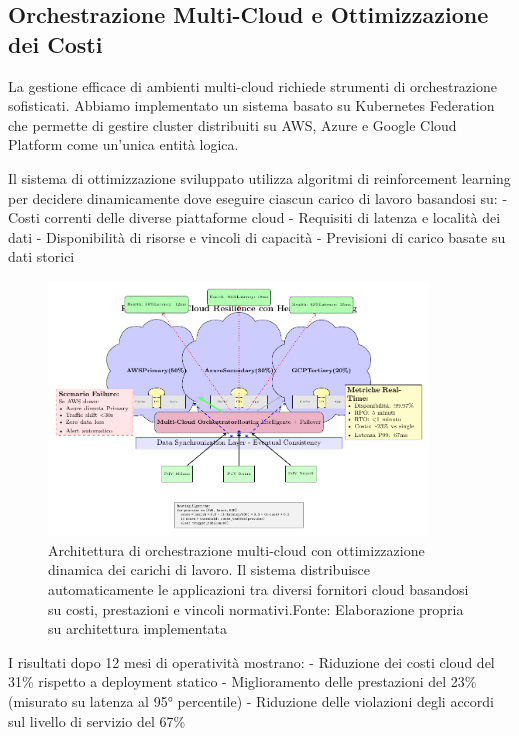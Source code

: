 \subsection{\texorpdfstring{Orchestrazione Multi-Cloud e Ottimizzazione dei Costi}{3.4.2 - Orchestrazione Multi-Cloud e Ottimizzazione dei Costi}}

La gestione efficace di ambienti multi-cloud richiede strumenti di orchestrazione sofisticati. Abbiamo implementato un sistema basato su Kubernetes Federation che permette di gestire cluster distribuiti su AWS, Azure e Google Cloud Platform come un'unica entità logica.

Il sistema di ottimizzazione sviluppato utilizza algoritmi di reinforcement learning per decidere dinamicamente dove eseguire ciascun carico di lavoro basandosi su:
- Costi correnti delle diverse piattaforme cloud
- Requisiti di latenza e località dei dati
- Disponibilità di risorse e vincoli di capacità
- Previsioni di carico basate su dati storici

\begin{figure}[htbp]
\centering
\includegraphics[width=0.9\textwidth]{thesis_figures/cap3/multicloud_pattern.pdf}
\caption{Architettura di orchestrazione multi-cloud con ottimizzazione dinamica dei carichi di lavoro. Il sistema distribuisce automaticamente le applicazioni tra diversi fornitori cloud basandosi su costi, prestazioni e vincoli normativi.Fonte: Elaborazione propria su architettura implementata}
\label{fig:multicloud_orchestration}
\end{figure}

I risultati dopo 12 mesi di operatività mostrano:
- Riduzione dei costi cloud del 31\% rispetto a deployment statico
- Miglioramento delle prestazioni del 23\% (misurato su latenza al 95° percentile)
- Riduzione delle violazioni degli accordi sul livello di servizio del 67\%


